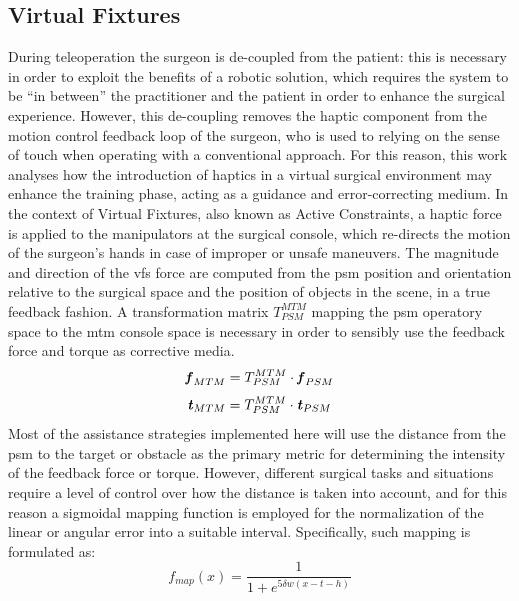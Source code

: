 \documentclass{article}
\newcommand{\vect}[1]{\textbf{\textit{#1}}}
\begin{document}
\begin{multicols}{2}
\subsection{Virtual Fixtures}
During teleoperation the surgeon is de-coupled from the patient: this is necessary in order to exploit the benefits of a robotic solution, which requires the system to be ``in between'' the practitioner and the patient in order to enhance the surgical experience. However, this de-coupling removes the haptic component from the motion control feedback loop of the surgeon, who is used to relying on the sense of touch when operating with a conventional approach. For this reason, this work analyses how the introduction of haptics in a virtual surgical environment may enhance the training phase, acting as a guidance and error-correcting medium. \newline
In the context of Virtual Fixtures, also known as Active Constraints, a haptic force is applied to the manipulators at the surgical console, which re-directs the motion of the surgeon's hands in case of improper or unsafe maneuvers. The magnitude and direction of the \acp{vf} force are computed from the \ac{psm} position and orientation relative to the surgical space and the position of objects in the scene, in a true feedback fashion. A transformation matrix $T_{PSM}^{MTM}$ mapping the \ac{psm} operatory space to the \ac{mtm} console space is necessary in order to sensibly use the feedback force and torque as corrective media. 
\begin{equation}
  \vect{f}_{MTM} = T_{PSM}^{MTM}\cdot \vect{f}_{PSM}
  \label{eq:forcepsm2mtm}
\end{equation}
\begin{equation}
  \vect{t}_{MTM} = T_{PSM}^{MTM}\cdot \vect{t}_{PSM}
  \label{eq:torquepsm2mtm}
\end{equation}
Most of the assistance strategies implemented here will use the distance from the \ac{psm} to the target or obstacle as the primary metric for determining the intensity of the feedback force or torque. However, different surgical tasks and situations require a level of control over how the distance is taken into account, and for this reason a sigmoidal mapping function is employed for the normalization of the linear or angular error into a suitable interval. Specifically, such mapping is formulated as:
\begin{equation}
  f_{map}(x) = \frac{1}{1+e^{5\delta w(x-t-h)}}
  \label{eq:sigmoidalmap}
\end{equation}

\end{multicols}
\end{document}
